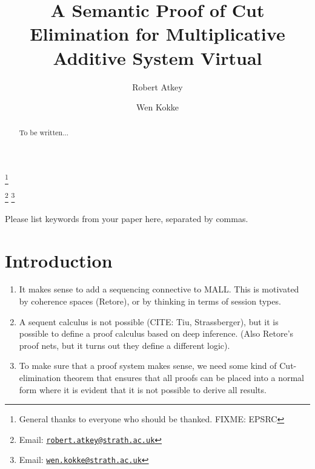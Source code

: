 \documentclass[twoside,11pt]{entics}
\begin{document}
\begin{frontmatter}
  \title{A Semantic Proof of Cut Elimination for Multiplicative Additive System Virtual}
  \thanks[ALL]{General thanks to everyone who should be thanked. FIXME: EPSRC}
  \author{Robert Atkey}
  \author{Wen Kokke}
  \address[msp]{%
    Mathematically Structured Programming\\
    Computer and Information Sciences\\
    University of Strathclyde\\
    Glasgow, Scotland, UK}
  \thanks[bobemail]%
  {Email: \href{robert.atkey@strath.ac.uk}%
    {\texttt{\normalshape robert.atkey@strath.ac.uk}}}
  \thanks[wenemail]%
  {Email: \href{wen.kokke@strath.ac.uk}%
    {\texttt{\normalshape wen.kokke@strath.ac.uk}}}
  \begin{abstract}
    To be written...
  \end{abstract}
  \begin{keyword}
    Please list keywords from your paper here, separated by commas.
  \end{keyword}
\end{frontmatter}

\section{Introduction}

\begin{enumerate}
\item It makes sense to add a sequencing connective to MALL. This is
  motivated by coherence spaces (Retore), or by thinking in terms of
  session types.
\item A sequent calculus is not possible (CITE: Tiu, Strassberger),
  but it is possible to define a proof calculus based on deep
  inference. (Also Retore's proof nets, but it turns out they define a
  different logic).
\item To make sure that a proof system makes sense, we need some kind
  of Cut-elimination theorem that ensures that all proofs can be
  placed into a normal form where it is evident that it is not
  possible to derive all results.
\end{enumerate}
\end{document}
